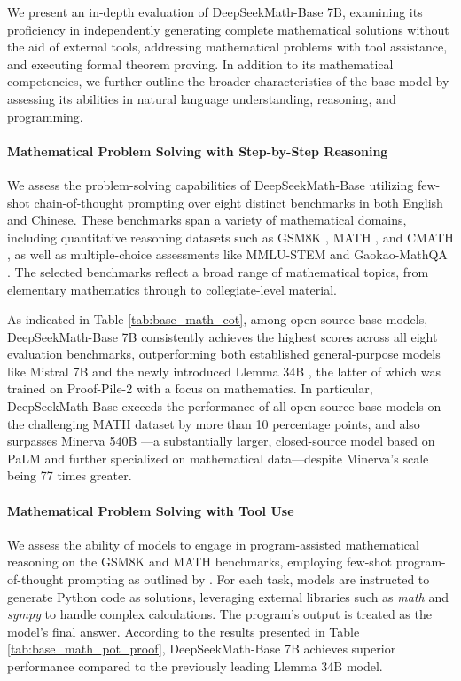 \begin{itemize}[topsep=0pt]
We present an in-depth evaluation of DeepSeekMath-Base 7B, examining its proficiency in independently generating complete mathematical solutions without the aid of external tools, addressing mathematical problems with tool assistance, and executing formal theorem proving. In addition to its mathematical competencies, we further outline the broader characteristics of the base model by assessing its abilities in natural language understanding, reasoning, and programming.

\paragraph{Mathematical Problem Solving with Step-by-Step Reasoning}

We assess the problem-solving capabilities of DeepSeekMath-Base utilizing few-shot chain-of-thought prompting \citep{cot} over eight distinct benchmarks in both English and Chinese. These benchmarks span a variety of mathematical domains, including quantitative reasoning datasets such as GSM8K \citep{gsm8k}, MATH \citep{MATH}, and CMATH \citep{wei2023cmath}, as well as multiple-choice assessments like MMLU-STEM \citep{mmlu} and Gaokao-MathQA \citep{agieval}. The selected benchmarks reflect a broad range of mathematical topics, from elementary mathematics through to collegiate-level material.

As indicated in Table \ref{tab:base_math_cot}, among open-source base models, DeepSeekMath-Base 7B consistently achieves the highest scores across all eight evaluation benchmarks, outperforming both established general-purpose models like Mistral 7B \citep{mistral} and the newly introduced Llemma 34B \citep{llemma}, the latter of which was trained on Proof-Pile-2 \citep{llemma} with a focus on mathematics. In particular, DeepSeekMath-Base exceeds the performance of all open-source base models on the challenging MATH dataset by more than 10 percentage points, and also surpasses Minerva 540B \citep{minerva}—a substantially larger, closed-source model based on PaLM \citep{palm} and further specialized on mathematical data—despite Minerva's scale being 77 times greater.

\paragraph{Mathematical Problem Solving with Tool Use} We assess the ability of models to engage in program-assisted mathematical reasoning on the GSM8K and MATH benchmarks, employing few-shot program-of-thought prompting as outlined by \citet{pot,pal}. For each task, models are instructed to generate Python code as solutions, leveraging external libraries such as \textit{math} and \textit{sympy} to handle complex calculations. The program's output is treated as the model’s final answer. According to the results presented in Table \ref{tab:base_math_pot_proof}, DeepSeekMath-Base 7B achieves superior performance compared to the previously leading Llemma 34B model.


\end{itemize}
